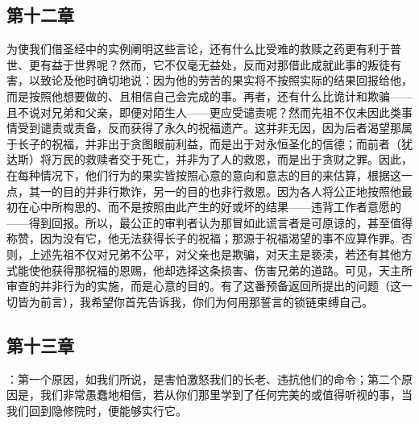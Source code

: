 
\subsection{第十二章}

\par

为使我们借圣经中的实例阐明这些言论，还有什么比受难的救赎之药更有利于普世、更有益于世界呢？然而，它不仅毫无益处，反而对那借此成就此事的叛徒有害，以致论及他时确切地说：因为他的劳苦的果实将不按照实际的结果回报给他，而是按照他想要做的、且相信自己会完成的事。再者，还有什么比诡计和欺骗——且不说对兄弟和父亲，即便对陌生人——更应受谴责呢？然而先祖不仅未因此类事情受到谴责或责备，反而获得了永久的祝福遗产。这并非无因，因为后者渴望那属于长子的祝福，并非出于贪图眼前利益，而是出于对永恒圣化的信德；而前者（犹达斯）将万民的救赎者交于死亡，并非为了人的救恩，而是出于贪财之罪。因此，在每种情况下，他们行为的果实皆按照心意的意向和意志的目的来估算，根据这一点，其一的目的并非行欺诈，另一的目的也非行救恩。因为各人将公正地按照他最初在心中所构思的、而不是按照由此产生的好或坏的结果——违背工作者意愿的——得到回报。所以，最公正的审判者认为那冒如此谎言者是可原谅的，甚至值得称赞，因为没有它，他无法获得长子的祝福；那源于祝福渴望的事不应算作罪。否则，上述先祖不仅对兄弟不公平，对父亲也是欺骗，对天主是亵渎，若还有其他方式能使他获得那祝福的恩赐，他却选择这条损害、伤害兄弟的道路。可见，天主所审查的并非行为的实施，而是心意的目的。有了这番预备返回所提出的问题（这一切皆为前言），我希望你首先告诉我，你们为何用那誓言的锁链束缚自己。\par


\subsection{第十三章}

\par

：第一个原因，如我们所说，是害怕激怒我们的长老、违抗他们的命令；第二个原因是，我们非常愚蠢地相信，若从你们那里学到了任何完美的或值得听视的事，当我们回到隐修院时，便能够实行它。\par

